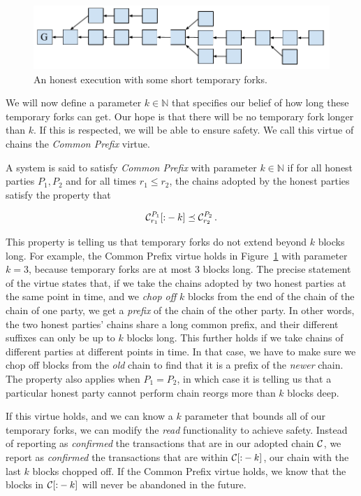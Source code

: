 \begin{figure}[h]
    \centering
    \includegraphics[width=0.7 \columnwidth,keepaspectratio]{figures/honest-chain-common-prefix.pdf}
    \caption{An honest execution with some short temporary forks.}
    \label{fig.honest-chain-common-prefix}
\end{figure}

We will now define a parameter $k \in \mathbb{N}$ that specifies our belief of how long
these temporary forks can get. Our hope is that there will be no temporary fork longer than
$k$. If this is respected, we will be able to ensure safety. We call this virtue of chains
the \emph{Common Prefix} virtue.

\begin{definition}
  A system is said to satisfy \emph{Common Prefix} with parameter $k \in \mathbb{N}$ if
  for all honest parties $P_1, P_2$ and for all times $r_1 \leq r_2$, the chains adopted
  by the honest parties satisfy the property that

  \[
    \mathcal{C}^{P_1}_{r_1}[{:}-k] \preceq \mathcal{C}^{P_2}_{r_2}\,.
  \]
\end{definition}

This property is telling us that temporary forks do not extend beyond $k$ blocks long.
For example, the Common Prefix virtue holds in Figure~\ref{fig.honest-chain-common-prefix}
with parameter $k = 3$, because temporary forks are at most $3$ blocks long. The precise
statement of the virtue states that, if we take the chains adopted by two honest parties
at the same point in time, and we \emph{chop off} $k$ blocks from the end of the chain of
the chain of one party, we get a \emph{prefix} of the chain of the other party. In other
words, the two honest parties' chains share a long common prefix, and their different
suffixes can only be up to $k$ blocks long.
This further holds if we take chains of different parties at different points in time.
In that case, we have to
make sure we chop off blocks from the \emph{old} chain to find that it is a prefix of the \emph{newer}
chain. The property also applies when $P_1 = P_2$, in which case it is telling us that
a particular honest party cannot perform chain reorgs more than $k$ blocks deep.

If this virtue holds, and we can know a $k$ parameter that bounds all of our temporary
forks, we can modify the \emph{read} functionality to achieve safety. Instead of reporting
as \emph{confirmed} the transactions that are in our adopted chain $\mathcal{C}$, we report as \emph{confirmed}
the transactions that are within $\mathcal{C}[{:}-k]$, our chain with the last $k$ blocks chopped
off. If the Common Prefix virtue holds, we know that the blocks in $\mathcal{C}[{:}-k]$ will never
be abandoned in the future.

